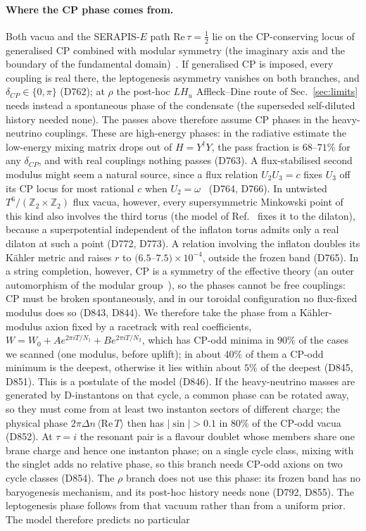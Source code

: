 \documentclass[aps,prd,twocolumn,superscriptaddress,nofootinbib,floatfix]{revtex4-2}
\begin{document}
\paragraph{Where the CP phase comes from.} Both vacua and the SERAPIS-$E$ path $\mathrm{Re}\,\tau=\tfrac12$ lie on the CP-conserving locus of generalised CP combined with modular symmetry (the imaginary axis and the boundary of the fundamental domain)~\cite{arXiv_1905_11970}. If generalised CP is imposed, every coupling is real there, the leptogenesis asymmetry vanishes on both branches, and $\delta_{CP}\in\{0,\pi\}$ (D762); at $\rho$ the post-hoc $LH_u$ Affleck--Dine route of Sec.~\ref{sec:limits} needs instead a spontaneous phase of the condensate (the superseded self-diluted history needed none). The passes above therefore assume CP phases in the heavy-neutrino couplings. These are high-energy phases: in the radiative estimate the low-energy mixing matrix drops out of $H=Y^\dagger Y$, the pass fraction is $68$--$71\%$ for any $\delta_{CP}$, and with real couplings nothing passes (D763). A flux-stabilised second modulus might seem a natural source, since a flux relation $U_2U_3=c$ fixes $U_3$ off its CP locus for most rational $c$ when $U_2=\omega$~\cite{arXiv_2405_18813} (D764, D766). In untwisted $T^6/(\mathbb{Z}_2\times\mathbb{Z}_2)$ flux vacua, however, every supersymmetric Minkowski point of this kind also involves the third torus (the model of Ref.~\cite{arXiv_2405_18813} fixes it to the dilaton), because a superpotential independent of the inflaton torus admits only a real dilaton at such a point (D772, D773). A relation involving the inflaton doubles its K\"ahler metric and raises $r$ to $(6.5$--$7.5)\times10^{-4}$, outside the frozen band (D765). In a string completion, however, CP is a symmetry of the effective theory (an outer automorphism of the modular group~\cite{arXiv_2010_10782,arXiv_1901_03251}), so the phases cannot be free couplings: CP must be broken spontaneously, and in our toroidal configuration no flux-fixed modulus does so (D843, D844). We therefore take the phase from a K\"ahler-modulus axion fixed by a racetrack with real coefficients, $W=W_0+Ae^{2\pi iT/N_1}+Be^{2\pi iT/N_2}$, which has CP-odd minima in $90\%$ of the cases we scanned (one modulus, before uplift); in about $40\%$ of them a CP-odd minimum is the deepest, otherwise it lies within about $5\%$ of the deepest (D845, D851). This is a postulate of the model (D846). If the heavy-neutrino masses are generated by D-instantons on that cycle, a common phase can be rotated away, so they must come from at least two instanton sectors of different charge; the physical phase $2\pi\Delta n\,\langle\mathrm{Re}\,T\rangle$ then has $|\sin|>0.1$ in $80\%$ of the CP-odd vacua (D852). At $\tau=i$ the resonant pair is a flavour doublet whose members share one brane charge and hence one instanton phase; on a single cycle class, mixing with the singlet adds no relative phase, so this branch needs CP-odd axions on two cycle classes (D854). The $\rho$ branch does not use this phase: its frozen band has no baryogenesis mechanism, and its post-hoc history needs none (D792, D855). The leptogenesis phase follows from that vacuum rather than from a uniform prior. The model therefore predicts no particular 
\end{document}
